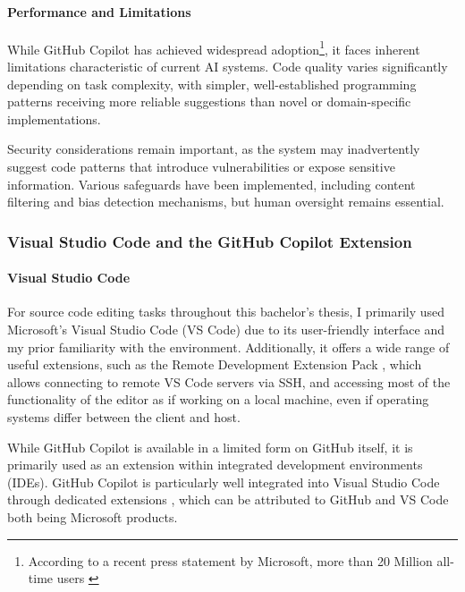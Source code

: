 \vspace{-0.8\baselineskip}
\paragraph{Performance and Limitations}
While GitHub Copilot has achieved widespread adoption\footnote{
    According to a recent press statement by Microsoft, more than 20 Million all-time users \cite{copilot-user-count}
}, it faces inherent limitations characteristic of current AI systems.
Code quality varies significantly depending on task complexity, with simpler, well-established programming patterns receiving more reliable suggestions than novel or domain-specific implementations.

Security considerations remain important, as the system may inadvertently suggest code patterns that introduce vulnerabilities or expose sensitive information.
Various safeguards have been implemented, including content filtering and bias detection mechanisms, but human oversight remains essential.

\def\sectitle{Visual Studio Code and the GitHub Copilot Extension}
\subsubsection[\sectitle]{\sectitle}

\paragraph{Visual Studio Code}
For source code editing tasks throughout this bachelor's thesis, I primarily used Microsoft's Visual Studio Code (VS Code) \cite{vscode} due to its user-friendly interface and my prior familiarity with the environment.
Additionally, it offers a wide range of useful extensions, such as the Remote Development Extension Pack \cite{vscode-remote}, which allows connecting to remote VS Code servers via SSH, and accessing most of the functionality of the editor as if working on a local machine, even if operating systems differ between the client and host.

While GitHub Copilot is available in a limited form on GitHub itself, it is primarily used as an extension within integrated development environments (IDEs). 
GitHub Copilot is particularly well integrated into Visual Studio Code through dedicated extensions \cite{vscode-copilot-extension}\cite{vscode-copilot-chat-extension}, which can be attributed to GitHub and VS Code both being Microsoft products.

